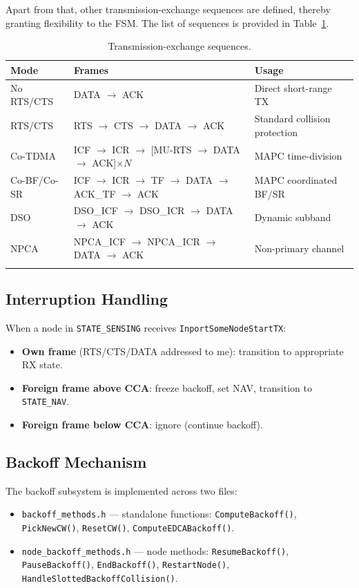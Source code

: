 \documentclass[11pt,a4paper]{article}
\begin{document}
Apart from that, other transmission-exchange sequences are defined, thereby granting flexibility to the FSM. The list of sequences is provided in Table~\ref{tab:tx_exchange}.

\begin{longtable}{l l p{5cm}}
\toprule
\textbf{Mode} & \textbf{Frames} & \textbf{Usage} \\
\midrule
No RTS/CTS & DATA $\to$ ACK & Direct short-range TX \\
RTS/CTS & RTS $\to$ CTS $\to$ DATA $\to$ ACK & Standard collision protection \\
Co-TDMA & ICF $\to$ ICR $\to$ [MU-RTS $\to$ DATA $\to$ ACK]$\times N$ & MAPC time-division \\
Co-BF/Co-SR & ICF $\to$ ICR $\to$ TF $\to$ DATA $\to$ ACK\_TF $\to$ ACK & MAPC coordinated BF/SR \\
DSO & DSO\_ICF $\to$ DSO\_ICR $\to$ DATA $\to$ ACK & Dynamic subband \\
NPCA & NPCA\_ICF $\to$ NPCA\_ICR $\to$ DATA $\to$ ACK & Non-primary channel \\
\bottomrule
\caption{Transmission-exchange sequences.}
\label{tab:tx_exchange}
\end{longtable}

\subsection{Interruption Handling}

When a node in \texttt{STATE\_SENSING} receives \texttt{InportSomeNodeStartTX}:
\begin{itemize}[nosep]
  \item \textbf{Own frame} (RTS/CTS/DATA addressed to me): transition to appropriate RX state.
  \item \textbf{Foreign frame above CCA}: freeze backoff, set NAV, transition to \texttt{STATE\_NAV}.
  \item \textbf{Foreign frame below CCA}: ignore (continue backoff).
\end{itemize}

\subsection{Backoff Mechanism}

The backoff subsystem is implemented across two files:
\begin{itemize}[nosep]
  \item \texttt{backoff\_methods.h} --- standalone functions: \texttt{ComputeBackoff()}, \texttt{PickNewCW()}, \texttt{ResetCW()}, \texttt{ComputeEDCABackoff()}.
  \item \texttt{node\_backoff\_methods.h} --- node methods: \texttt{ResumeBackoff()}, \texttt{PauseBackoff()}, \texttt{EndBackoff()}, \texttt{RestartNode()}, \texttt{HandleSlottedBackoffCollision()}.
\end{itemize}
\end{document}
